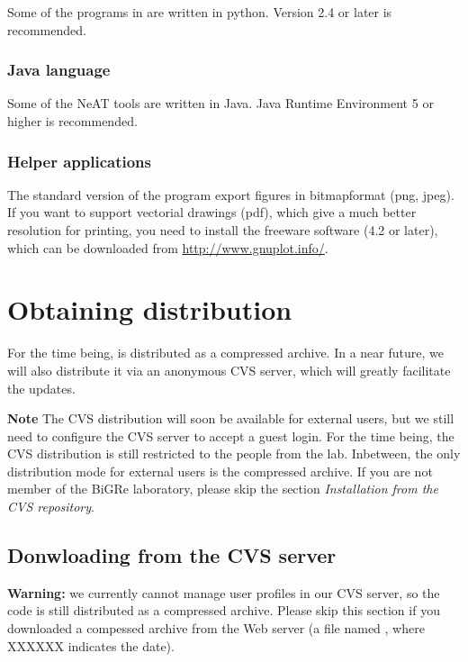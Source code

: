\documentclass{book}
\begin{document}
Some of the programs in \RSAT are written in python. Version 2.4 or
later is recommended.

\subsection{Java language}

Some of the NeAT tools are written in Java. Java Runtime Environment 5 or higher is recommended.

\subsection{Helper applications}

The standard version of the program  export figures
in bitmapformat (png, jpeg). If you want to support vectorial drawings
(pdf), which give a much better resolution for printing, you need to
install the freeware software  (4.2 or later), which
can be downloaded from \url{http://www.gnuplot.info/}.



\chapter{Obtaining \RSAT distribution}

For the time being, \RSAT is distributed as a compressed archive. In a
near future, we will also distribute it via an anonymous CVS server,
which will greatly facilitate the updates.

\textbf{Note} The CVS distribution will soon be available for external
users, but we still need to configure the CVS server to accept a guest
login. For the time being, the CVS distribution is still restricted to
the people from the lab. Inbetween, the only distribution mode for
external users is the compressed archive. If you are not member of the
BiGRe laboratory, please skip the section \textit{Installation from
  the CVS repository}.

\section{Donwloading \RSAT from the CVS server}

\textbf{Warning:} we currently cannot manage user profiles in our CVS
server, so the \RSAT code is still distributed as a compressed
archive. Please skip this section if you downloaded a compessed
archive from the Web server (a file named
, where XXXXXX indicates the date).
\end{document}
